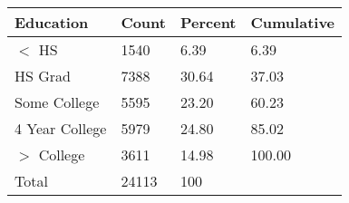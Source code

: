 \begin{table}[ht]
\centering
\begin{tabular}{llll}
 Education & Count & Percent & Cumulative \\ 
  \hline
$<$ HS & 1540 &  6.39 &   6.39 \\ 
  HS Grad & 7388 & 30.64 &  37.03 \\ 
  Some College & 5595 & 23.20 &  60.23 \\ 
  4 Year College & 5979 & 24.80 &  85.02 \\ 
  $>$ College & 3611 & 14.98 & 100.00 \\ 
   \hline
Total & 24113 & 100 &  \\ 
  \end{tabular}
\end{table}
